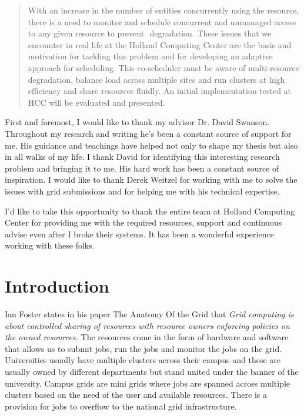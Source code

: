 \documentclass[ms,electronic,double]{nuthesis}
\begin{document}
\begin{abstract}
With an increase in the number of entities concurrently using the resource, there is a need to monitor and schedule concurrent and unmanaged access to any given resource to prevent  degradation. These issues that we encounter in real life at the Holland Computing Center 
are the basis and motivation for tackling this problem and for developing an adaptive approach for scheduling. 
This co-scheduler must be aware of multi­-resource degradation, balance load across multiple sites and 
run clusters at high efficiency and share resources fluidly. An initial implementation tested at HCC will 
be evaluated and presented. 

  
\end{abstract}


\begin{acknowledgments}

First and foremost, I would like to thank my advisor Dr. David Swanson. Throughout my research
and writing he's been a constant source of support for me. His guidance and teachings have helped not 
only to shape my thesis but also in all walks of my life. I thank David for identifying this interesting
research problem and bringing it to me. His hard work has been a constant source of inspiration.
 I would like to thank Derek Weitzel for working with me to solve the 
 issues with grid submissions and for helping me with his technical expertise.
 
 I'd like to take this opportunity to thank the entire team at Holland 
Computing Center for providing me with the required resources, support and continuous advise
 even after I broke their systems. It has been a wonderful experience 
 working with these folks.
 
\end{acknowledgments}

\tableofcontents
\newpage
\listoffigures


\mainmatter

\chapter{Introduction}
Ian Foster states in his paper The Anatomy Of the Grid \cite{Foster:2001:AGE:1080644.1080667} that 
\emph{Grid computing is about controlled sharing of resources with resource owners enforcing policies 
on the owned resources.} The resources come in the form of hardware 
and software that allows us to submit jobs, run the jobs and monitor the jobs on the grid. 
Universities usually have multiple clusters across their campus and these are 
usually owned by different departments but stand united under the banner of the university.
Campus grids are mini grids where jobs are spanned across multiple clusters
 based on the need of the user and available resources. There is a provision for jobs to overflow to the national
grid infrastructure\cite{derekThesis}.
\end{document}
